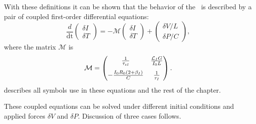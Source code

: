 With these definitions it can be shown\cite{irwin2005transition} that the behavior of the \TES\ is described by a pair of coupled first-order differential equations:
\begin{equation}
\frac{d}{\mathop{dt}} \begin{pmatrix} \delta I \\ \delta T \end{pmatrix}
	= - \mathcal{M} \begin{pmatrix}	\delta I \\	\delta T \end{pmatrix}
      + \begin{pmatrix} \delta V / L \\ \delta P /C \end{pmatrix},
\end{equation}
where the matrix $\mathcal{M}$ is
\begin{equation}
\mathcal{M} = \begin{pmatrix}
		\frac{1}{\tau_{el}} & \frac{\mathcal{L}_I G}{I_0 L} \\[0.75em] 
		-\frac{I_0 R_0(2 + \beta_I)}{C} & \frac{1}{\tau_I}
    \end{pmatrix}.
\end{equation}
 describes all symbols use in these equations and the rest of the chapter.

These coupled equations can be solved under different initial conditions and applied forces $\delta V$ and $\delta P$.
Discussion of three cases follows.


